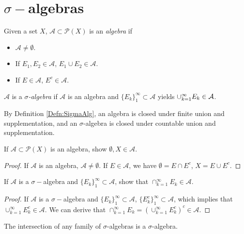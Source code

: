 \section{$\sigma-$algebras}
\begin{defn}
    \label{Defn:SigmaAlg}
    Given a set $X$, $\mathcal{A}\subset\mathcal{P}(X)$ 
    is an \textit{algebra} if 
    \begin{itemize}
        \item $\mathcal{A}\neq\emptyset$.
        \item If $E_1,E_2\in\mathcal{A}$, $E_1\cup E_2\in\mathcal{A}$.
        \item If $E\in\mathcal{A}$, $E^{c}\in\mathcal{A}$.
    \end{itemize}
    $\mathcal{A}$ is a \textit{$\sigma$-algebra} if 
    $\mathcal{A}$ is an algebra and 
    $\{E_{k}\}_1^{\infty}\subset\mathcal{A}$ yields 
    $\cup_{k=1}^{\infty}E_k\in\mathcal{A}$.
\end{defn}
\begin{rem}
    By Definition \ref{Defn:SigmaAlg}, an algebra is closed 
    under finite union and supplementation, 
    and an $\sigma$-algebra is closed under 
    countable union and supplementation.
\end{rem}
\begin{exc}
    If $\mathcal{A}\subset\mathcal{P}(X)$ is an algebra, 
    show $\emptyset,X\in\mathcal{A}$.
\end{exc}
\begin{proof}
    If $\mathcal{A}$ is an algebra, $\mathcal{A}\neq\emptyset$. 
    If $E\in\mathcal{A}$, we have $\emptyset=E\cap E^c$, $X=E\cup E^c$.
\end{proof}
\begin{exc}
    If $\mathcal{A}$ is a $\sigma-$algebra and 
    $\{E_{k}\}_{1}^{\infty}\subset\mathcal{A}$, show that 
    $\cap_{k=1}^{\infty}E_{k}\in\mathcal{A}$.
\end{exc}
\begin{proof}
    If $\mathcal{A}$ is a $\sigma-$algebra and 
    $\{E_{k}\}_{1}^{\infty}\subset\mathcal{A}$, 
    $\{E_{k}^c\}_{1}^{\infty}\subset\mathcal{A}$,
    which implies that $\cup_{k=1}^{\infty}E_{k}^c\in\mathcal{A}$.
    We can derive that $\cap_{k=1}^{\infty}E_{k}=(\cup_{k=1}^{\infty}E_{k}^c)^c\in\mathcal{A}$.
\end{proof}
\begin{lem}
    \label{Lem:IntersecOfSigmaAlg}
    The intersection of any family of $\sigma$-algebras is a 
    $\sigma$-algebra.
\end{lem}

